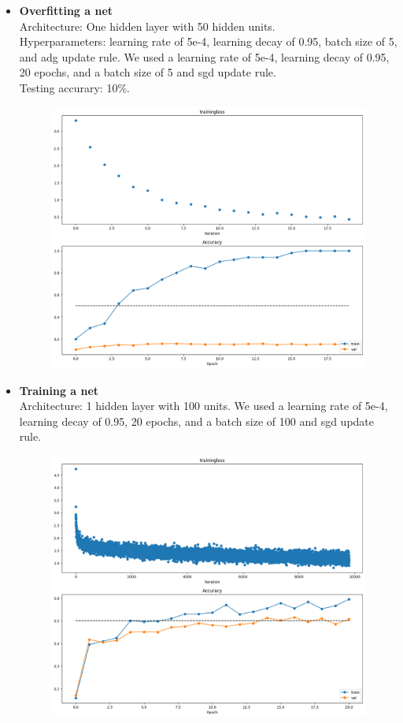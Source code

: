 \begin{itemize}
  
  \item \textbf{Overfitting a net}\\
    Architecture: One hidden layer with 50 hidden units.\\
    Hyperparameters: learning rate of 5e-4, learning decay of 0.95, batch size of 5, and adg update rule.
    We used a learning rate of 5e-4, learning decay of 0.95, 20 epochs, and a batch size of 5 and sgd update rule.\\
    Testing accurary: 10\%.

    \begin{figure}[!ht]
        \centering
        {{\includegraphics[scale = 0.45]{../nets/overfit_net/diagrams.png}}}  
    \end{figure}


  \item \textbf{Training a net}\\
    Architecture: 1 hidden layer with 100 units.
    We used a learning rate of 5e-4, learning decay of 0.95, 20 epochs, and a batch size of 100 and sgd update rule.

    \begin{figure}[!ht]
        \centering
        {{\includegraphics[scale = 0.45]{../nets/train_net/diagrams.png}}}  
    \end{figure}


\end{itemize}
